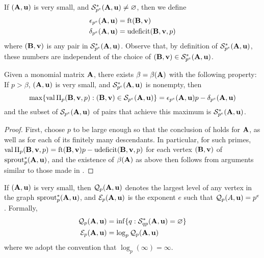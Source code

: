 \documentclass{amsart}
\begin{document}
\begin{definition}%
   \label{epsilon delta: D}
   If $(\mathbf{A},\mathbf{u})$ is very small, and $\mathcal{S}^{\ast}_{p^e}(\mathbf{A},\mathbf{u}) \neq \varnothing$, then we define
   \begin{align*}
     \epsilon_{p^e}(\mathbf{A},\mathbf{u}) & = \operatorname{ft}(\mathbf{B}, \mathbf{v}) \\
     \delta_{p^e}(\mathbf{A},\mathbf{u}) & = \operatorname{udeficit}(\mathbf{B},\mathbf{v},p)
   \end{align*}
   where $(\mathbf{B},\mathbf{v})$ is any pair in $\mathcal{S}^{\ast}_{p^e}(\mathbf{A},\mathbf{u})$.
   Observe that, by definition of $\mathcal{S}^{\ast}_{p^e}(\mathbf{A},\mathbf{u})$, these numbers are independent of the choice of $(\mathbf{B},\mathbf{v}) \in \mathcal{S}^{\ast}_{p^e}(\mathbf{A},\mathbf{u})$.
\end{definition}

\begin{proposition}
   \label{p large graph: P}
   Given a monomial matrix $\mathbf{A}$, there exists $\beta = \beta(\mathbf{A})$ with the following property\textup:
   If $p > \beta$, $(\mathbf{A},\mathbf{u})$ is very small, and $\mathcal{S}_{p^e}^{\ast}(\mathbf{A},\mathbf{u})$ is nonempty, then
   \[
      \max \{ \operatorname{val} \Pi_p(\mathbf{B},\mathbf{v},p) : (\mathbf{B},\mathbf{v}) \in \mathcal{S}_{p^e}(\mathbf{A},\mathbf{u}) \} = \epsilon_{p^e}(\mathbf{A},\mathbf{u}) p-\delta_{p^e}(\mathbf{A},\mathbf{u})
   \]
   and the subset of $\mathcal{S}_{p^e}(\mathbf{A},\mathbf{u})$ of pairs that achieve this maximum is $\mathcal{S}^{\ast}_{p^e}(\mathbf{A},\mathbf{u})$.
\end{proposition}

\begin{proof}
   First, choose $p$ to be large enough so that the conclusion of  holds for $\mathbf{A}$, as well as for each of its finitely many descendants.
   In particular, for such primes, $\operatorname{val} \Pi_p(\mathbf{B},\mathbf{v},p) = \operatorname{ft}(\mathbf{B}, \mathbf{v})p-\operatorname{udeficit}(\mathbf{B},\mathbf{v},p)$  for each vertex $(\mathbf{B},\mathbf{v})$ of $\operatorname{sprout}_p^{\ast}(\mathbf{A},\mathbf{u})$, and the existence of $\beta(\mathbf{A})$ as above then follows from arguments similar to those made in .
\end{proof}

\begin{definition}
\label{depth-of-graph: D}
   If $(\mathbf{A},\mathbf{u})$ is very small, then $\mathcal{Q}_p(\mathbf{A},\mathbf{u})$ denotes the largest level of any vertex in the graph $\operatorname{sprout}_p^{\ast}(\mathbf{A},\mathbf{u})$, and $\mathcal{E}_p(\mathbf{A}, \mathbf{u})$ is the exponent $e$ such that $\mathcal{Q}_p(A, \mathbf{u}) = p^{e}$.  Formally,
   \begin{align*}
      \mathcal{Q}_p(\mathbf{A},\mathbf{u}) & = \inf \{ q :  \mathcal{S}^{\ast}_{qp}(\mathbf{A},\mathbf{u}) = \varnothing \} \\       
      \mathcal{E}_p(\mathbf{A},\mathbf{u}) & = \log_p \mathcal{Q}_p(\mathbf{A}, \mathbf{u})
   \end{align*}
   where we adopt the convention that $\log_p (\infty) = \infty$.
\end{definition}
\end{document}
